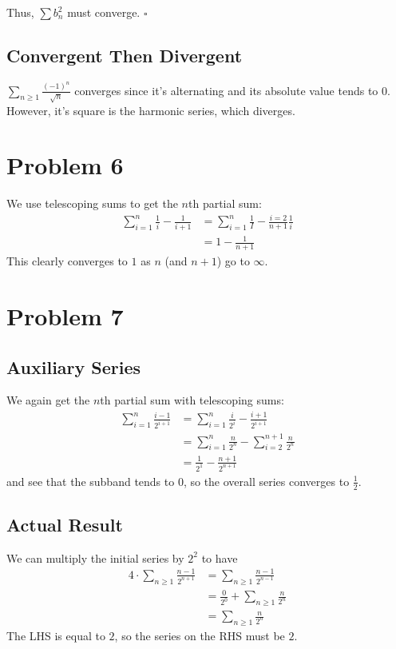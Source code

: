 \documentclass[12pt]{article}
\begin{document}
Thus, $\sum b_n^2$ must converge. $\square$

\subsection{Convergent Then Divergent}

$\sum_{n \ge 1} \frac{(-1)^n}{\sqrt{n}}$ converges since it's
alternating and its absolute value tends to $0$.
However, it's square is the harmonic series, which diverges.

\section{Problem 6}

We use telescoping sums to get the $n$th partial sum:
\begin{align*}
  \sum_{i=1}^{n} \frac{1}{i}-\frac{1}{i+1}
   & = \sum_{i=1}^{n} \frac{1}{I} - \frac{i=2}{n+1} \frac{1}{i} \\
   & = 1-\frac{1}{n+1}
\end{align*}
This clearly converges to $\boxed{1}$ as $n$ (and $n+1$) go to $\infty$.

\section{Problem 7}

\subsection{Auxiliary Series}

We again get the $n$th partial sum with telescoping sums:
\begin{align*}
  \sum_{i=1}^{n} \frac{i-1}{2^{i+1}}
   & = \sum_{i=1}^{n} \frac{i}{2^i} - \frac{i+1}{2^{i+1}}            \\
   & = \sum_{i=1}^{n} \frac{n}{2^n} - \sum_{i=2}^{n+1} \frac{n}{2^n} \\
   & = \frac{1}{2^1}-\frac{n+1}{2^{n+1}}
\end{align*}
and see that the subband tends to $0$, so the overall series converges to $\boxed{\frac{1}{2}}$.

\subsection{Actual Result}

We can multiply the initial series by $2^2$ to have
\begin{align*}
  4 \cdot \sum_{n \ge 1} \frac{n-1}{2^{n+1}}
   & = \sum_{n \ge 1} \frac{n-1}{2^{n-1}}           \\
   & = \frac{0}{2^0} + \sum_{n \ge 1} \frac{n}{2^n} \\
   & = \sum_{n \ge 1} \frac{n}{2^n}
\end{align*}
The LHS is equal to $2$, so the series on the RHS must be $\boxed{2}$.
\end{document}
